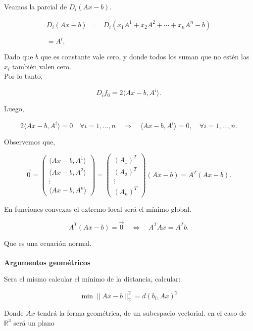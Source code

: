 \begin{ejem}
Veamos la parcial de $D_i\left(Ax-b\right)$.

$$
\begin{array}{rcl}
    D_i\left(Ax-b\right)&=&D_i\left(x_1A^1+x_2A^2+\cdots+x_nA^n-b\right)\\\\
    =A^i.
\end{array}
$$

Dado que $b$ que es constante vale cero, y donde todos los suman que no estén las $x_i$ también valen cero.\\

Por lo tanto,

$$D_if_0 = 2\langle Ax-b,A^i \rangle.$$

Luego,

$$2\langle Ax-b,A^i \rangle = 0 \quad \forall i=1,\ldots,n \quad \Rightarrow \quad \langle Ax-b,A^i\rangle=0,\quad \forall i = 1,\ldots,n.$$

Observemos que,

$$
\overrightarrow{0} = 
\begin{pmatrix}
    \langle Ax-b,A^1\rangle\\
    \langle Ax-b,A^2\rangle\\
    \vdots\\
    \langle Ax-b,A^n\rangle
\end{pmatrix}
=
\begin{pmatrix}
    (A_1)^T\\
    (A_2)^T\\
    \vdots\\
    (A_n)^T
\end{pmatrix}
(Ax-b)
=A^T(Ax-b).
$$

En funciones convexas el extremo local será el mínimo global.

$$A^T(Ax-b)=\overrightarrow{0}\quad \Leftrightarrow\quad A^TAx=A^Tb.$$

Que es una ecuación normal.\\\\

\textbf{Argumentos geométricos}

Sera el mismo calcular el mínimo de la distancia, calcular:

$$\min \|Ax-b\|^2_2 = d(b_i,Ax)^2$$

Donde $Ax$ tendrá la forma geométrica, de un subespacio vectorial. en el caso de $\mathbb{R}^3$ será un plano\\


\end{ejem}
